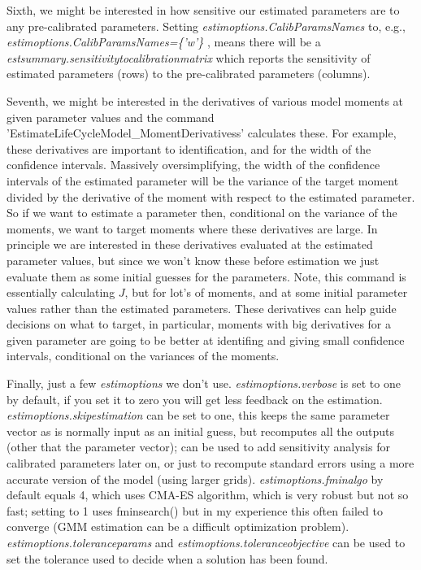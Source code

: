 Sixth, we might be interested in how sensitive our estimated parameters are to any pre-calibrated parameters. Setting \textit{estimoptions.CalibParamsNames} to, e.g., \textit{estimoptions.CalibParamsNames=\{'w'\} }, means there will be a \textit{estsummary.sensitivitytocalibrationmatrix} which reports the sensitivity of estimated parameters (rows) to the pre-calibrated parameters (columns).

Seventh, we might be interested in the derivatives of various model moments at given parameter values and the command 'EstimateLifeCycleModel\_{}MomentDerivativess' calculates these. For example, these derivatives are important to identification, and for the width of the confidence intervals. Massively oversimplifying, the width of the confidence intervals of the estimated parameter will be the variance of the target moment divided by the derivative of the moment with respect to the estimated parameter. So if we want to estimate a parameter then, conditional on the variance of the moments, we want to target moments where these derivatives are large. In principle we are interested in these derivatives evaluated at the estimated parameter values, but since we won't know these before estimation we just evaluate them as some initial guesses for the parameters. Note, this command is essentially calculating $J$, but for lot's of moments, and at some initial parameter values rather than the estimated parameters. These derivatives can help guide decisions on what to target, in particular, moments with big derivatives for a given parameter are going to be better at identifing and giving small confidence intervals, conditional on the variances of the moments.

Finally, just a few \textit{estimoptions} we don't use. \textit{estimoptions.verbose} is set to one by default, if you set it to zero you will get less feedback on the estimation. \textit{estimoptions.skipestimation} can be set to one, this keeps the same parameter vector as is normally input as an initial guess, but recomputes all the outputs (other that the parameter vector); can be used to add sensitivity analysis for calibrated parameters later on, or just to recompute standard errors using a more accurate version of the model (using larger grids). \textit{estimoptions.fminalgo} by default equals 4, which uses CMA-ES algorithm, which is very robust but not so fast; setting to 1 uses fminsearch() but in my experience this often failed to converge (GMM estimation can be a difficult optimization problem). \textit{estimoptions.toleranceparams} and \textit{\textit{estimoptions}.toleranceobjective} can be used to set the tolerance used to decide when a solution has been found.

